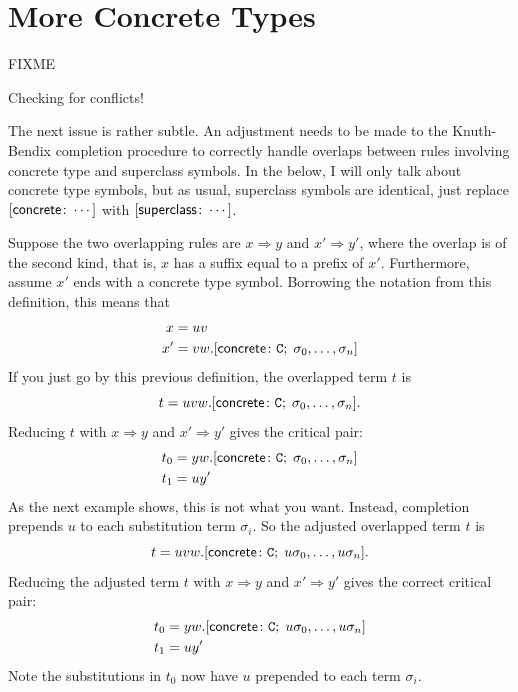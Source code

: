 \documentclass[../generics]{subfiles}
\begin{document}
\section{More Concrete Types}\label{sec:concrete types}

\begin{algorithm}\label{alg:adjust concrete type}
FIXME
\end{algorithm}

\begin{algorithm}\label{alg:subst simplification}
\end{algorithm}


Checking for conflicts!

The next issue is rather subtle. An adjustment needs to be made to the Knuth-Bendix completion procedure to correctly handle overlaps between rules involving concrete type and superclass symbols. In the below, I will only talk about concrete type symbols, but as usual, superclass symbols are identical, just replace $[\mathsf{concrete}\colon \cdots]$ with $[\mathsf{superclass}\colon \cdots]$.

Suppose the two overlapping rules are $x\Rightarrow y$ and $x'\Rightarrow y'$, where the overlap is of the second kind, that is, $x$ has a suffix equal to a prefix of $x'$. Furthermore, assume $x'$ ends with a concrete type symbol. Borrowing the notation from this definition, this means that
\begin{align*}
x&=uv\\
x'&=vw.[\mathsf{concrete}\colon \texttt{C};\;\sigma_0,\ldots,\sigma_n]
\end{align*}
If you just go by this previous definition, the overlapped term $t$ is
\[t=uvw.[\mathsf{concrete}\colon \texttt{C};\;\sigma_0,\ldots,\sigma_n].\]
Reducing $t$ with $x\Rightarrow y$ and $x'\Rightarrow y'$ gives the critical pair:
\begin{align*}
t_0&=yw.[\mathsf{concrete}\colon \texttt{C};\;\sigma_0,\ldots,\sigma_n]\\
t_1&=uy'
\end{align*}
As the next example shows, this is not what you want. Instead, completion prepends $u$ to each substitution term $\sigma_i$. So the adjusted overlapped term $t$ is
\[t=uvw.[\mathsf{concrete}\colon \texttt{C};\;u\sigma_0,\ldots,u\sigma_n].\]
Reducing the adjusted term $t$ with $x\Rightarrow y$ and $x'\Rightarrow y'$ gives the correct critical pair:
\begin{align*}
t_0&=yw.[\mathsf{concrete}\colon \texttt{C};\;u\sigma_0,\ldots,u\sigma_n]\\
t_1&=uy'
\end{align*}
Note the substitutions in $t_0$ now have $u$ prepended to each term $\sigma_i$.
\end{document}
